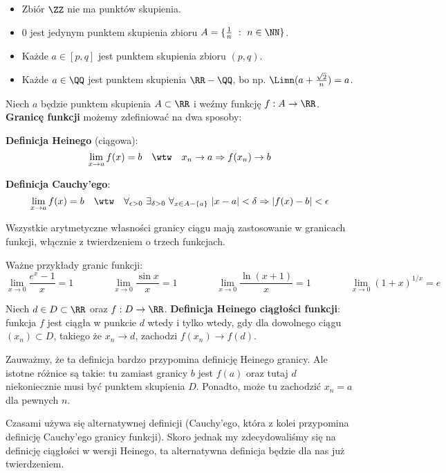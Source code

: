 \begin{example}
    \begin{itemize}
        \item Zbiór $\ZZ$ nie ma punktów skupienia.
        \item 0 jest jedynym punktem skupienia zbioru $A = \{\frac{1}{n} \ : \ n \in \NN\}$.
        \item Każde $a \in [p, q]$ jest punktem skupienia zbioru $(p, q)$.
        \item Każde $a \in \QQ$ jest punktem skupienia $\RR - \QQ$, bo np. $\Limn (a + \frac{\sqrt{2}}{n}) = a$.
    \end{itemize}
\end{example}

Niech $a$ będzie punktem skupienia $A \subset \RR$ i weźmy funkcję $f : A \to \RR$. \textbf{Granicę funkcji} możemy zdefiniować na dwa sposoby:

\textbf{Definicja Heinego} (ciągowa):
$$\lim_{x \to a} f(x) = b \quad \wtw \quad x_n \to a \Rightarrow f(x_n) \to b$$

\textbf{Definicja Cauchy'ego}:
$$\lim_{x \to a} f(x) = b \quad \wtw \quad \forall_{\epsilon > 0} \ \exists_{\delta > 0} \ \forall_{x \in A - \{a\}} \ |x - a| < \delta \Rightarrow |f(x) - b| < \epsilon$$

Wszystkie arytmetyczne własności granicy ciągu mają zastosowanie w granicach funkcji, włącznie z twierdzeniem o trzech funkcjach.

\begin{example}
    Ważne przykłady granic funkcji:
    $$\lim_{x \to 0} \frac{e^x - 1}{x} = 1 \qquad \qquad \lim_{x \to 0} \frac{\sin x}{x} = 1 \qquad \qquad \lim_{x \to 0} \frac{\ln(x + 1)}{x} = 1 \qquad \qquad \lim_{x \to 0} (1 + x)^{1/x} = e$$
\end{example}

Niech $d \in D \subset \RR$ oraz $f : D \to \RR$. \textbf{Definicja Heinego ciągłości funkcji}: funkcja $f$ jest ciągła w punkcie $d$ wtedy i tylko wtedy, gdy dla dowolnego ciągu $(x_n) \subset D$, takiego że $x_n \to d$, zachodzi $f(x_n) \to f(d)$.

Zauważmy, że ta definicja bardzo przypomina definicję Heinego granicy. Ale istotne różnice są takie: tu zamiast granicy $b$ jest $f(a)$ oraz tutaj $d$ niekoniecznie musi być punktem skupienia $D$. Ponadto, może tu zachodzić $x_n = a$ dla pewnych $n$.

Czasami używa się alternatywnej definicji (Cauchy'ego, która z kolei przypomina definicję Cauchy'ego granicy funkcji). Skoro jednak my zdecydowaliśmy się na definicję ciągłości w wersji Heinego, ta alternatywna definicja będzie dla nas już twierdzeniem.

